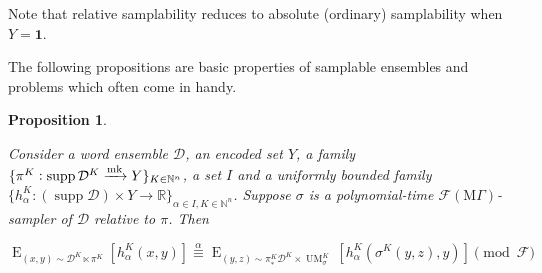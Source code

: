 \documentclass{article}
\numberwithin{equation}{section}
\theoremstyle{definition}
\theoremstyle{plain}
\newtheorem{proposition}{Proposition}[section]
\DeclareMathOperator{\Supp}{supp}
\DeclareMathOperator{\E}{E}
\DeclareMathOperator{\UM}{UM}
\newcommand{\Nats}{\mathbb{N}}
\newcommand{\Reals}{\mathbb{R}}
\newcommand{\Dist}{\mathcal{D}}
\newcommand{\MGrow}{\mathrm{M}\Gamma}
\newcommand{\Fall}{\mathcal{F}}
\newcommand{\EMG}{\Fall(\MGrow)}
\newcommand{\Markov}{\xrightarrow{\textnormal{mk}}}
\begin{document}
Note that relative samplability reduces to absolute (ordinary) samplability when $Y=\bm{1}$.

The following propositions are basic properties of samplable ensembles and problems which often come in handy.

\begin{samepage}
\begin{proposition}
\label{prp:smp}

Consider a word ensemble $\Dist$, an encoded set $Y$, a family ${\{\pi^K: \Supp \Dist^{K} \Markov Y\}_{K \in \Nats^n}}$, a set ${I}$ and a uniformly bounded family ${\{h_\alpha^K: (\Supp \Dist) \times Y \rightarrow \Reals\}_{\alpha \in I, K \in \Nats^n}}$. Suppose $\sigma$ is a polynomial-time $\EMG$-sampler of $\Dist$ relative to $\pi$. Then

\begin{equation}
\label{eqn:prp__smp}
\E_{(x,y) \sim \Dist^{K} \ltimes \pi^K}[h_\alpha^K(x,y)] \overset{\alpha}{\equiv} \E_{(y,z) \sim \pi_*^K\Dist^{K} \times \UM_\sigma^K}[h_\alpha^K(\sigma^K(y,z),y)] \pmod \Fall
\end{equation}

\end{proposition}
\end{samepage}
\end{document}
